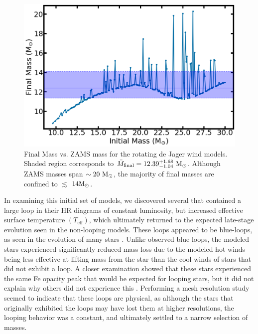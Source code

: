 \documentclass[twocolumn]{aastex631}
\begin{document}
\begin{figure}[hbt!]
    \centering
    \includegraphics[scale=0.25]{final_vs_initial_mass.png}
    \caption{Final Mass vs. ZAMS mass for the rotating de Jager wind models. Shaded region corresponds to  $\bar{M}_{\rm final}=12.39^{+1.68}_{-1.04}\ \rm M_{\odot}$. Although ZAMS masses span $\sim 20\ \rm M_{\odot}$, the majority of final masses are confined to $\lesssim$ $14 \rm M_{\odot}$.}
    \label{fig:ZFM}
\end{figure}

In examining this initial set of models, we discovered several that contained a large loop in their HR diagrams of constant luminosity, but increased effective surface temperature $(T_{\text{eff}})$, which ultimately returned to the expected late-stage evolution seen in the non-looping models.  These loops appeared to be blue-loops, as seen in the evolution of many stars \citep[e.g.][]{bl04,paxton5}. Unlike observed blue loops, the modeled stars experienced significantly reduced mass-loss due to the modeled hot winds being less effective at lifting mass from the star than the cool winds of stars that did not exhibit a loop. A closer examination showed that these stars experienced the same Fe opacity peak that would be expected for looping stars, but it did not explain why others did not experience this \citep{paxton5}.  Performing a mesh resolution study seemed to indicate that these loops are physical, as although the stars that originally exhibited the loops may have lost them at higher resolutions, the looping behavior was a constant, and ultimately settled to a narrow selection of masses.
\end{document}
